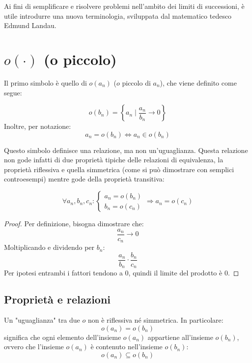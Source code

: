 %
%
%
%


Ai fini di semplificare e risolvere problemi nell'ambito dei limiti di successioni, è utile introdurre una nuova terminologia, sviluppata dal matematico tedesco Edmund Landau.

\section{\texorpdfstring{$o(\cdot)$ (o piccolo)}{o piccolo}}
Il primo simbolo è quello di $o(a_n)$ ($o$ piccolo di $a_n$), che viene definito come segue:
\begin{defin}
	\[
		o(b_n)=\left\{a_n \mid \frac{a_n}{b_n}\to0\right\}
	\]
	Inoltre, per notazione:
	\[
		a_n=o(b_n)\iff a_n\in o(b_n)
	\]
\end{defin}
Questo simbolo definisce una relazione, ma non un'uguaglianza. Questa relazione non gode infatti di due proprietà tipiche delle relazioni di equivalenza, la proprietà riflessiva e quella simmetrica (come si può dimostrare con semplici controesempi) mentre gode della proprietà transitiva:
\begin{prop}[Transitiva]
	\label{optrans}
	\[
		\forall a_n,b_n,c_n:
		\begin{cases}
			a_n=o(b_n) \\
			b_n=o(c_n)
		\end{cases}\Rightarrow a_n=o(c_n)
	\]
\end{prop}
\begin{proof}
	Per definizione, bisogna dimostrare che:
	\[
		\frac{a_n}{c_n}\to0
	\]
	Moltiplicando e dividendo per $b_n$:
	\[
		\frac{a_n}{b_n}\cdot \frac{b_n}{c_n}
	\]
	Per ipotesi entrambi i fattori tendono a $0$, quindi il limite del prodotto è $0$.
\end{proof}

\subsection{Proprietà e relazioni}
Un "uguaglianza" tra due $o$ non è riflessiva né simmetrica. In particolare:
\[
	o(a_n)=o(b_n)
\]
significa che ogni elemento dell'insieme $o(a_n)$ appartiene all'insieme $o(b_n)$, ovvero che l'insieme $o(a_n)$ è contenuto nell'insieme $o(b_n)$:
\[
	o(a_n)\subseteq o(b_n)
\]

